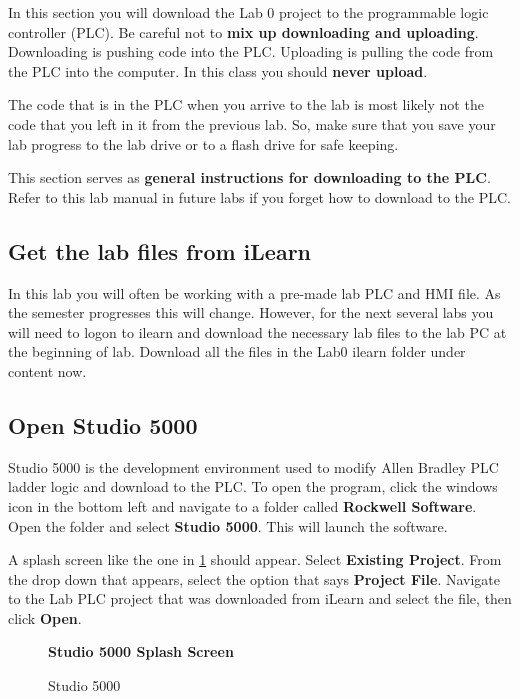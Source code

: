 In this section you will download the Lab 0 project to the programmable logic controller (PLC). Be careful not to \textbf{mix up downloading and uploading}. Downloading is pushing code into the PLC. Uploading is pulling the code from the PLC into the computer. In this class you should \textbf{never upload}. 

The code that is in the PLC when you arrive to the lab is most likely not the code that you left in it from the previous lab. So, make sure that you save your lab progress to the lab drive or to a flash drive for safe keeping. 

This section serves as \textbf{general instructions for downloading to the PLC}. Refer to this lab manual in future labs if you forget how to download to the PLC.

\subsection{Get the lab files from iLearn}

In this lab you will often be working with a pre-made lab PLC and HMI file. As the semester progresses this will change. However, for the next several labs you will need to logon to ilearn and download the necessary lab files to the lab PC at the beginning of lab. Download all the files in the Lab0 ilearn folder under content now.

\subsection{Open Studio 5000}

Studio 5000 is the development environment used to modify Allen Bradley PLC ladder logic and download to the PLC. To open the program, click the windows icon in the bottom left and navigate to a folder called \textbf{Rockwell Software}. Open the folder and select \textbf{Studio 5000}. This will launch the software.

A splash screen like the one in \figureautorefname \ref{fig:SplashScreen} should appear. Select \textbf{Existing Project}. From the drop down that appears, select the option that says \textbf{Project File}. Navigate to the Lab PLC project that was downloaded from iLearn and select the file, then click \textbf{Open}.

\begin{figure}[h]
\centering
\textbf{Studio 5000 Splash Screen}\par \medskip
{}
\caption{Studio 5000}
\label{fig:SplashScreen}
\end{figure}

